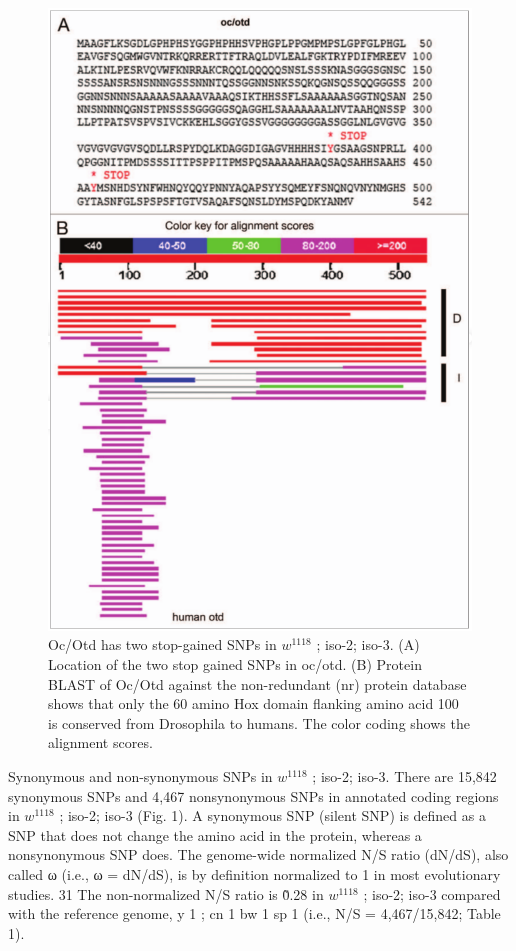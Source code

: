 \begin{figure}
    \centering
    \includegraphics[width=14cm]{snpeff_fig3.png}
    \caption{Oc/Otd has two stop-gained SNPs in $w^{1118}$ ; iso-2; iso-3. (A) Location of the two stop gained SNPs in oc/otd. (B) Protein BLAST of Oc/Otd against the non-redundant (nr) protein database shows that only the 60 amino Hox domain flanking amino acid 100 is conserved from Drosophila to humans. The color coding shows the alignment scores.}
    \label{fig:snpeffTab3}
\end{figure}

Synonymous and non-synonymous SNPs in $w^{1118}$ ; iso-2; iso-3. There are 15,842 synonymous SNPs and 4,467 nonsynonymous SNPs in annotated coding regions in $w^{1118}$ ; iso-2; iso-3 (Fig. 1). A synonymous SNP (silent SNP) is defined as a SNP that does not change the amino acid in the protein, whereas a nonsynonymous SNP does. The genome-wide normalized N/S ratio (dN/dS), also called ω (i.e., ω = dN/dS), is by definition normalized to 1 in most evolutionary studies. 31 The non-normalized N/S ratio is \~0.28 in $w^{1118}$ ; iso-2; iso-3 compared with the reference genome, y 1 ; cn 1 bw 1 sp 1 (i.e., N/S = 4,467/15,842; Table 1).


